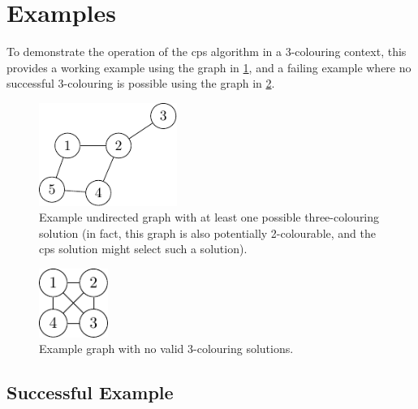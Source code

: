 \section{\label{sec:gcol:examples}Examples}

To demonstrate the operation of the \gls{cps} algorithm in a 3-colouring context, this  provides a working example using the graph in \cref{fig:gcol:examplegraph}, and a failing example where no successful 3-colouring is possible using the graph in \cref{fig:gcol:examplegraphnosol}.

\begin{figure}
    \centering
    \includegraphics[width=0.4\textwidth]{chapters/gcol/figs/examplegraph1-figure2.pdf}
    \caption[Example graph with at least one possible three-colouring solution]{Example undirected graph with at least one possible three-colouring solution (in fact, this graph is also potentially 2-colourable, and the \gls{cps} solution might select such a solution).}
    \label{fig:gcol:examplegraph}
\end{figure}

\begin{figure}
    \centering
    \includegraphics[width=0.2\textwidth]{chapters/gcol/figs/examplegraph1-figure3.pdf}
    \caption{Example graph with no valid 3-colouring solutions.}
    \label{fig:gcol:examplegraphnosol}
\end{figure}

\subsection{Successful Example}

